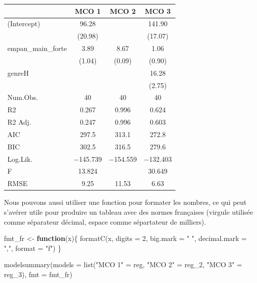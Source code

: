 \documentclass[
  11pt,
]{book}
\newenvironment{Shaded}{\begin{snugshade}}{\end{snugshade}}
\newcommand{\AttributeTok}[1]{\textcolor[rgb]{0.77,0.63,0.00}{#1}}
\newcommand{\ControlFlowTok}[1]{\textcolor[rgb]{0.13,0.29,0.53}{\textbf{#1}}}
\newcommand{\DecValTok}[1]{\textcolor[rgb]{0.00,0.00,0.81}{#1}}
\newcommand{\FunctionTok}[1]{\textcolor[rgb]{0.00,0.00,0.00}{#1}}
\newcommand{\NormalTok}[1]{#1}
\newcommand{\OtherTok}[1]{\textcolor[rgb]{0.56,0.35,0.01}{#1}}
\newcommand{\StringTok}[1]{\textcolor[rgb]{0.31,0.60,0.02}{#1}}
\numberwithin{equation}{section}
\numberwithin{countremarque}{section}
\begin{document}
\begin{table}[H]
\centering
\begin{tabular}[t]{lccc}
\toprule
  & MCO 1 & MCO 2 & MCO 3\\
\midrule
(Intercept) & \num{96.28} &  & \num{141.90}\\
 & (\num{20.98}) &  & (\num{17.07})\\
empan\_main\_forte & \num{3.89} & \num{8.67} & \num{1.06}\\
 & (\num{1.04}) & (\num{0.09}) & (\num{0.90})\\
genreH &  &  & \num{16.28}\\
 &  &  & (\num{2.75})\\
\midrule
Num.Obs. & \num{40} & \num{40} & \num{40}\\
R2 & \num{0.267} & \num{0.996} & \num{0.624}\\
R2 Adj. & \num{0.247} & \num{0.996} & \num{0.603}\\
AIC & \num{297.5} & \num{313.1} & \num{272.8}\\
BIC & \num{302.5} & \num{316.5} & \num{279.6}\\
Log.Lik. & \num{-145.739} & \num{-154.559} & \num{-132.403}\\
F & \num{13.824} &  & \num{30.649}\\
RMSE & \num{9.25} & \num{11.53} & \num{6.63}\\
\bottomrule
\end{tabular}
\end{table}

Nous pouvons aussi utiliser une fonction pour formater les nombres, ce qui peut s'avérer utile pour produire un tableau avec des normes françaises (virgule utilisée comme séparateur décimal, espace comme sépartateur de milliers).

\begin{Shaded}
\begin{Highlighting}[]
\NormalTok{fmt\_fr }\OtherTok{\textless{}{-}} \ControlFlowTok{function}\NormalTok{(x)\{}
  \FunctionTok{formatC}\NormalTok{(x, }\AttributeTok{digits =} \DecValTok{2}\NormalTok{, }\AttributeTok{big.mark =} \StringTok{" "}\NormalTok{, }\AttributeTok{decimal.mark =} \StringTok{","}\NormalTok{, }\AttributeTok{format =} \StringTok{"f"}\NormalTok{)}
\NormalTok{\}}
\end{Highlighting}
\end{Shaded}

\begin{Shaded}
\begin{Highlighting}[]
\FunctionTok{modelsummary}\NormalTok{(}\AttributeTok{models =} \FunctionTok{list}\NormalTok{(}\StringTok{"MCO 1"} \OtherTok{=}\NormalTok{ reg,}
                           \StringTok{"MCO 2"} \OtherTok{=}\NormalTok{ reg\_2,}
                           \StringTok{"MCO 3"} \OtherTok{=}\NormalTok{ reg\_3),}
             \AttributeTok{fmt =}\NormalTok{ fmt\_fr)}
\end{Highlighting}
\end{Shaded}
\end{document}

